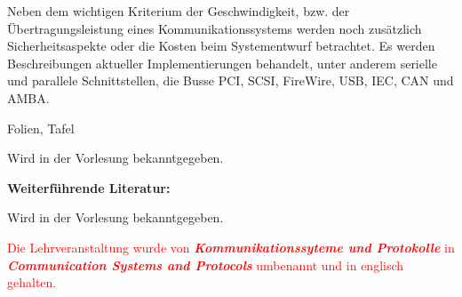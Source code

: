 \begin{course}
\begin{content}
 

Neben dem wichtigen Kriterium der Geschwindigkeit, bzw. der Übertragungsleistung eines Kommunikationssystems werden noch zusätzlich Sicherheitsaspekte oder die Kosten beim Systementwurf betrachtet. Es werden Beschreibungen aktueller Implementierungen behandelt, unter anderem serielle und parallele Schnittstellen, die Busse PCI, SCSI, FireWire, USB, IEC, CAN und AMBA.


\end{content}

\begin{media}Folien, Tafel

\end{media}

\begin{literature}Wird in der Vorlesung bekanntgegeben.

 

\textbf{Weiterführende Literatur:}

 

Wird in der Vorlesung bekanntgegeben.

\end{literature}

\begin{remarks}\textcolor{red}{Die Lehrveranstaltung wurde von \emph{\textbf{Kommunikationssyteme und Protokolle} }in \textbf{\emph{Communication Systems and Protocols}} umbenannt und in englisch gehalten.}

\end{remarks}

\end{course}
